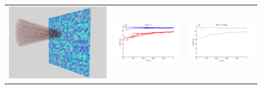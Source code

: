 \documentclass[twocolumn]{article}
\begin{document}
\begin{figure}
\begin{tabular}{|c|c|c|}
\\
\hline 
\includegraphics[scale=.2]{plane_demo.png}
&\includegraphics[scale=.35]{plane_all.png}
&\includegraphics[scale=.35]{plane_average.png}

\end{tabular}
\end{figure}
\end{document}
